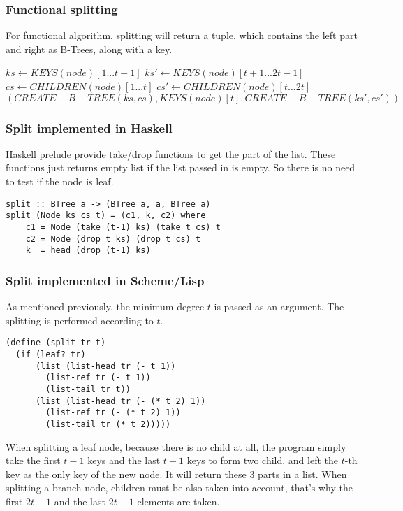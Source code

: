 \documentclass{article}
\begin{document}
\subsubsection{Functional splitting}

For functional algorithm, splitting will return a tuple, which contains the
left part and right as B-Trees, along with a key.

\begin{algorithmic}[1]
  \State $ks \leftarrow KEYS(node)[1 ... t-1]$
  \State $ks' \leftarrow KEYS(node)[t+1 ... 2t-1]$
    \State $cs \leftarrow CHILDREN(node)[1 ... t]$
    \State $cs' \leftarrow CHILDREN(node)[t ... 2t]$
  \EndIf
  \State \Return $(CREATE-B-TREE(ks, cs), KEYS(node)[t], CREATE-B-TREE(ks', cs'))$
\EndFunction
\end{algorithmic}

\subsubsection*{Split implemented in Haskell}
Haskell prelude provide take/drop functions to get the part
of the list. These functions just returns empty list if the 
list passed in is empty. So there is no need to test if
the node is leaf.

\lstset{language=Haskell}
\begin{lstlisting}
split :: BTree a -> (BTree a, a, BTree a)
split (Node ks cs t) = (c1, k, c2) where
    c1 = Node (take (t-1) ks) (take t cs) t
    c2 = Node (drop t ks) (drop t cs) t
    k  = head (drop (t-1) ks)
\end{lstlisting}

\subsubsection*{Split implemented in Scheme/Lisp}
As mentioned previously, the minimum degree $t$ is passed as an argument.
The splitting is performed according to $t$.

\lstset{language=lisp}
\begin{lstlisting}
(define (split tr t)
  (if (leaf? tr)
      (list (list-head tr (- t 1))
	    (list-ref tr (- t 1))
	    (list-tail tr t))
      (list (list-head tr (- (* t 2) 1)) 
	    (list-ref tr (- (* t 2) 1))
	    (list-tail tr (* t 2)))))
\end{lstlisting}

When splitting a leaf node, because there is no child at all, the
program simply take the first $t-1$ keys and the last $t-1$ keys
to form two child, and left the $t$-th key as the only key of the
new node. It will return these 3 parts in a list. When splitting
a branch node, children must be also taken into account, that's
why the first $2t-1$ and the last $2t-1$ elements are taken.
\end{document}
